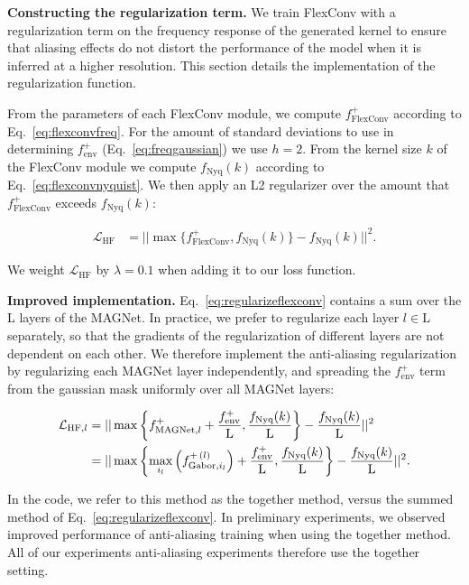 \documentclass{article} \usepackage{iclr2022_conference,times}
\begin{document}
\textbf{Constructing the regularization term.} We train FlexConv with a regularization term on the frequency response of the generated kernel to ensure that aliasing effects do not distort the performance of the model when it is inferred at a higher resolution. This section details the implementation of the regularization function.

From the parameters of each FlexConv module, we compute $f^+_{\textrm{FlexConv}}$ according to Eq.~\ref{eq:flexconvfreq}. For the amount of standard deviations to use in determining $f^+_{\mathrm{env}}$ (Eq.~\ref{eq:freqgaussian}) we use $h = 2$. From the kernel size $k$ of the FlexConv module we compute $f_{\textrm{Nyq}}(k)$ according to Eq.~\ref{eq:flexconvnyquist}. We then apply an L2 regularizer over the amount that $f^+_{\textrm{FlexConv}}$ exceeds $f_{\textrm{Nyq}}(k)$:

\begin{align}
    \mathcal{L}_{\mathrm{HF}} &= ||\max\{f^+_{\textrm{FlexConv}}, f_{\textrm{Nyq}}(k)\} - f_{\textrm{Nyq}}(k)||^2. \label{eq:regularizeflexconv}
\end{align}

We weight $\mathcal{L}_{\mathrm{HF}}$ by $\lambda = 0.1$ when adding it to our loss function.

\textbf{Improved implementation.} Eq.~\ref{eq:regularizeflexconv} contains a sum over the $\mathrm{L}$ layers of the MAGNet. In practice, we prefer to regularize each layer $l \in \mathrm{L}$ separately, so that the gradients of the regularization of different layers are not dependent on each other. We therefore implement the anti-aliasing regularization by regularizing each MAGNet layer independently, and spreading the $f^+_{\mathrm{env}}$ term from the gaussian mask uniformly over all MAGNet layers:

\begin{align}
    \mathcal{L}_{\mathrm{HF},l} &= ||\max\left\{  f^+_{\textrm{MAGNet},l} + \frac{f^+_{\mathrm{env}}}{\mathrm{L}} , \frac{f_{\textrm{Nyq}}(k)}{\mathrm{L}} \right\} - \frac{f_{\textrm{Nyq}}(k)}{\mathrm{L}} ||^2 \label{eq:regularizeflexconvlayerwise} \\
    &= || \max\left\{ \max_{i_l}\left(f^{+\hspace{0.5mm}(l)}_{\mathrm{Gabor}, i_l}\right) + \frac{f^+_{\mathrm{env}}}{\mathrm{L}}, \frac{f_{\textrm{Nyq}}(k)}{\mathrm{L}} \right\} - \frac{f_{\textrm{Nyq}}(k)}{\mathrm{L}} ||^2.
\end{align}

In the code, we refer to this method as the {\btt together} method, versus the {\btt summed} method of Eq.~\ref{eq:regularizeflexconv}. In preliminary experiments, we observed improved performance of anti-aliasing training when using the {\btt together} method. All of our experiments anti-aliasing experiments therefore use the {\btt together} setting.
\end{document}
